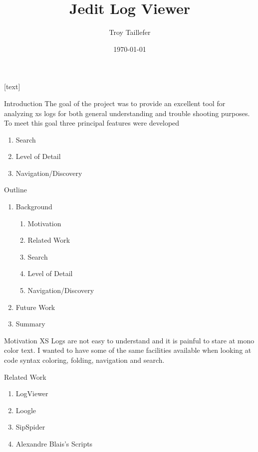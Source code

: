 \documentclass{beamer}
\title{Jedit Log Viewer}
\author{Troy Taillefer}
\institute{Broadsoft}
\date{\today}
\begin{document}
[text]

\frame{\titlepage}

\begin{frame}{Introduction}
The goal of the project was to provide an excellent tool for analyzing xs logs 
for both general understanding and trouble shooting purposes. To meet this goal three
principal features were developed

\begin{enumerate}
\item Search
\item Level of Detail
\item Navigation/Discovery
\end{enumerate}
\end{frame}

\begin{frame}{Outline}
\begin{enumerate}
\item Background
\begin{enumerate}
\item Motivation
\item Related Work
\item Search
\item Level of Detail
\item Navigation/Discovery
\end{enumerate}
\item Future Work
\item Summary
\end{enumerate}
\end{frame}


\begin{frame}{Motivation}
XS Logs are not easy to understand and 
it is painful to stare at mono color text. I wanted to have some of the same facilities available when looking at code syntax coloring, folding, navigation and search. 
\end{frame}

\begin{frame}{Related Work}

\begin{enumerate}
\item LogViewer
\item Loogle\cite{Loogle}
\item SipSpider
\item Alexandre Blais's Scripts
\end{enumerate}
\end{frame}
\end{document}

